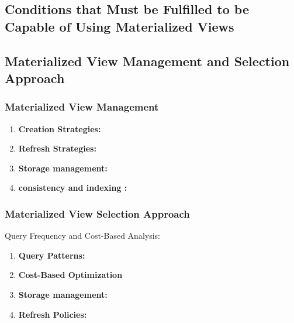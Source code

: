 \subsection{Conditions that Must be Fulfilled to be Capable of Using Materialized Views }

\subsection{ Materialized View Management and Selection Approach}

\subsubsection{Materialized View Management }


\begin{enumerate}[label=\alph*)]
    \item \textbf{Creation Strategies:}
    \item \textbf{Refresh Strategies:}
    \item \textbf{Storage management:}
    \item \textbf{consistency and  indexing :}
\end{enumerate}
\subsubsection{Materialized View Selection Approach}

  Query Frequency and Cost-Based Analysis:
  
\begin{enumerate}[label=\alph*)]
    \item \textbf{Query Patterns:}
    \item \textbf{Cost-Based Optimization}
    \item \textbf{Storage management:}
    \item \textbf{ Refresh Policies:}
\end{enumerate}



